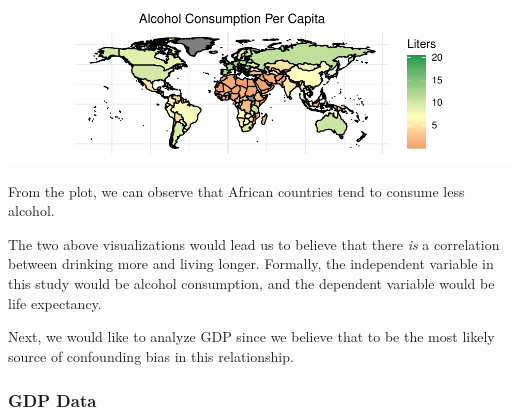 \documentclass[
]{article}
\begin{document}
\begin{center}\includegraphics{final_report_files/figure-latex/unnamed-chunk-5-1} \end{center}

From the plot, we can observe that African countries tend to consume
less alcohol.

The two above visualizations would lead us to believe that there
\emph{is} a correlation between drinking more and living longer.
Formally, the independent variable in this study would be alcohol
consumption, and the dependent variable would be life expectancy.

Next, we would like to analyze GDP since we believe that to be the most
likely source of confounding bias in this relationship.

\hypertarget{gdp-data}{%
\subsubsection{GDP Data}\label{gdp-data}}
\end{document}
